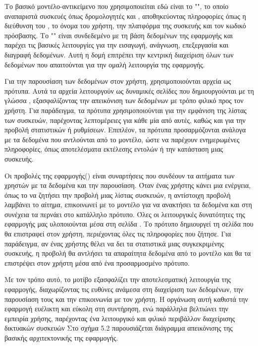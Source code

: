 Το βασικό μοντέλο-αντικείμενο που χρησιμοποιείται εδώ είναι το "", 
το οποίο αναπαριστά συσκευές όπως δρομολογητές και , 
αποθηκεύοντας πληροφορίες όπως η διεύθυνση του , το όνομα του
χρήστη, την πλατφόρμα της συσκευής και τον κωδικό πρόσβασης.
Το "" είναι συνδεδεμένο με 
τη βάση δεδομένων της εφαρμογής και παρέχει τις βασικές λειτουργίες 
για την εισαγωγή, ανάγνωση, επεξεργασία και διαγραφή δεδομένων. 
Αυτή η δομή επιτρέπει την κεντρική διαχείριση όλων των δεδομένων που 
απαιτούνται για την ομαλή λειτουργία της εφαρμογής.

Για την παρουσίαση των δεδομένων στον χρήστη, χρησιμοποιούνται αρχεία 
 ως πρότυπα. Αυτά τα αρχεία λειτουργούν ως δυναμικές σελίδες 
που δημιουργούνται με τη γλώσσα , εξασφαλίζοντας 
την απεικόνιση των δεδομένων με τρόπο φιλικό προς τον χρήστη. 
Για παράδειγμα, τα πρότυπα χρησιμοποιούνται για την εμφάνιση της λίστας των συσκευών, παρέχοντας λεπτομέρειες για κάθε μία από αυτές, καθώς και για την προβολή στατιστικών ή ρυθμίσεων. Επιπλέον, τα πρότυπα προσαρμόζονται ανάλογα με τα δεδομένα που αντλούνται από το μοντέλο, ώστε να παρέχουν ενημερωμένες πληροφορίες, όπως αποτελέσματα εκτέλεσης εντολών ή την κατάσταση μιας συσκευής.

Οι προβολές της εφαρμογής() είναι συναρτήσεις  που συνδέουν 
τα αιτήματα των χρηστών με τα δεδομένα και την παρουσίαση. 
Όταν ένας χρήστης κάνει μια ενέργεια, όπως το να ζητήσει την προβολή 
μιας λίστας συσκευών, η αντίστοιχη προβολή λαμβάνει το αίτημα, 
επικοινωνεί με το μοντέλο για να ανακτήσει τα δεδομένα και στη 
συνέχεια τα περνάει στο κατάλληλο πρότυπο. Όλες οι λειτουργικές δυνατότητες της εφαρμογής μας υλοποιούνται μέσα στη σελίδα .
Το πρότυπο δημιουργεί τη σελίδα  που θα επιστραφεί στον χρήστη, περιέχοντας όλες τις πληροφορίες που ζήτησε. Για παράδειγμα, αν ένας χρήστης θέλει να δει τα στατιστικά μιας συγκεκριμένης συσκευής, η προβολή θα αντλήσει τα απαραίτητα δεδομένα από το μοντέλο και θα τα επιστρέψει στον χρήστη μέσα από ένα προσαρμοσμένο πρότυπο.

Με τον τρόπο αυτό, το μοτίβο  εξασφαλίζει την αποτελεσματική 
λειτουργία της εφαρμογής, διαχωρίζοντας τις ευθύνες ανάμεσα στη 
διαχείριση των δεδομένων, την παρουσίαση τους και την επικοινωνία με τον χρήστη. Η οργάνωση αυτή καθιστά την εφαρμογή ευέλικτη και εύκολη στη συντήρηση, ενώ παράλληλα βελτιώνει την εμπειρία χρήσης, παρέχοντας ένα λειτουργικό και φιλικό περιβάλλον διαχείρισης δικτυακών συσκευών
Στο σχήμα 5.2 παρουσιάζεται διάγραμμα απεικόνισης της βασικής αρχιτεκτονικής της εφαρμογής.

